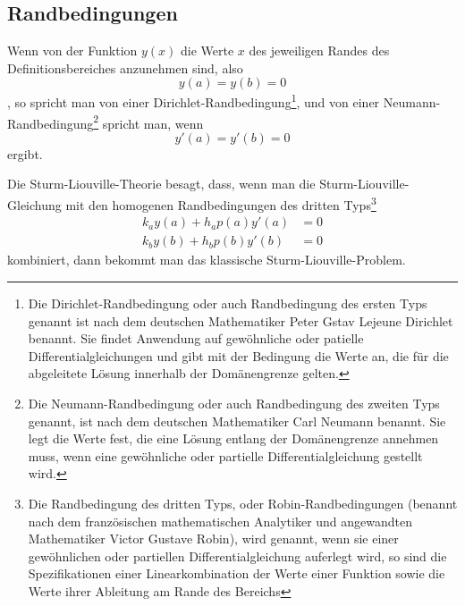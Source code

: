 \subsection{Randbedingungen\label{sub:was-ist-das-slp-randbedingungen}}
Wenn von der Funktion $y(x)$ die Werte $x$ des jeweiligen Randes des Definitionsbereiches anzunehmen sind, also
\begin{equation}
	y(a) = y(b) = 0
\end{equation}
, so spricht man von einer Dirichlet-Randbedingung\footnote{Die Dirichlet-Randbedingung oder auch Randbedingung des ersten Typs genannt ist nach dem deutschen Mathematiker Peter Gstav Lejeune Dirichlet benannt. Sie findet Anwendung auf gewöhnliche oder patielle Differentialgleichungen und gibt mit der Bedingung die Werte an, die für die abgeleitete Lösung innerhalb der Domänengrenze gelten.}, und von einer Neumann-Randbedingung\footnote{Die Neumann-Randbedingung oder auch Randbedingung des zweiten Typs genannt, ist nach dem deutschen Mathematiker Carl Neumann benannt. Sie legt die Werte fest, die eine Lösung entlang der Domänengrenze annehmen muss, wenn eine gewöhnliche oder partielle Differentialgleichung gestellt wird.} spricht man, wenn
\begin{equation}
	y'(a) = y'(b) = 0
\end{equation}
ergibt.

Die Sturm-Liouville-Theorie besagt, dass, wenn man die Sturm-Liouville-Gleichung mit den homogenen Randbedingungen des dritten Typs\footnote{Die Randbedingung des dritten Typs, oder Robin-Randbedingungen (benannt nach dem französischen mathematischen Analytiker und angewandten Mathematiker Victor Gustave Robin), wird genannt, wenn sie einer gewöhnlichen oder partiellen Differentialgleichung auferlegt wird, so sind die Spezifikationen einer Linearkombination der Werte einer Funktion sowie die Werte ihrer Ableitung am Rande des Bereichs}
\begin{equation}
\begin{aligned}
	\label{eq:randbedingungen}
	k_a y(a) + h_a p(a) y'(a) &= 0 \\
	k_b y(b) + h_b p(b) y'(b) &= 0
\end{aligned}
\end{equation}
kombiniert, dann bekommt man das klassische Sturm-Liouville-Problem.

